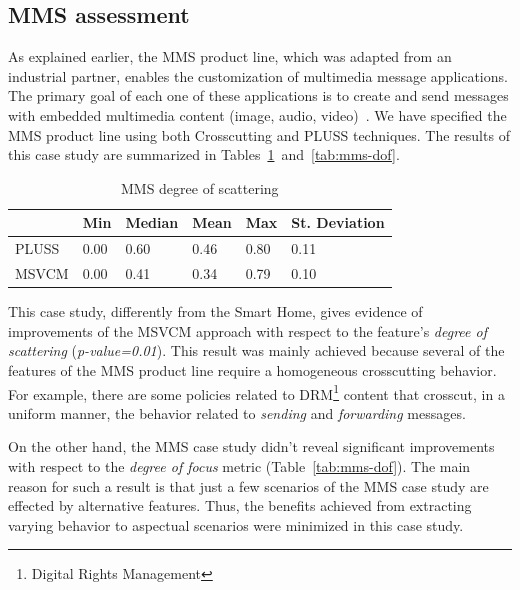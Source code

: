 
\subsection{MMS assessment}

As explained earlier, the MMS product line, which was adapted from an industrial
partner, enables the customization of multimedia message applications. The
primary goal of each one of these applications is to create and send messages
with embedded multimedia content (image, audio, video)~\cite{Bonifacio:2008aa}.
We have specified the MMS product line using both Crosscutting and PLUSS
techniques. The results of this case study are
summarized in Tables~\ref{tab:mms-dos}~and~\ref{tab:mms-dof}.

\begin{table}[htb] \centering
\caption{MMS degree of scattering}
\label{tab:mms-dos}
\begin{small}
\begin{tabular}{llllll} \hline
					& Min 	& Median 	& Mean 	& Max 	& St. Deviation \\ \hline 
	PLUSS			& 0.00  & 0.60   	& 0.46  & 0.80 	& 0.11 			\\
	MSVCM			& 0.00  & 0.41   	& 0.34 	& 0.79 	& 0.10			\\ \hline	
\end{tabular}
\end{small}
\end{table}

This case study, differently from the Smart Home, gives evidence of improvements of the
MSVCM approach with respect to the feature's \emph{degree of scattering}
(\emph{p-value=0.01}). This result was mainly achieved because several of the features of
the MMS product line require a homogeneous crosscutting behavior. For example,
there are some policies related to DRM\footnote{Digital Rights Management}
content that crosscut, in a uniform manner, the behavior related to
\emph{sending} and \emph{forwarding} messages.

On the other hand, the MMS case study didn't reveal significant improvements with
respect to the \emph{degree of focus} metric (Table~\ref{tab:mms-dof}). The main reason for such a result is that just a few scenarios of the MMS case study are effected by alternative
features. Thus, the benefits achieved from extracting varying behavior to
aspectual scenarios were minimized in this case study.

